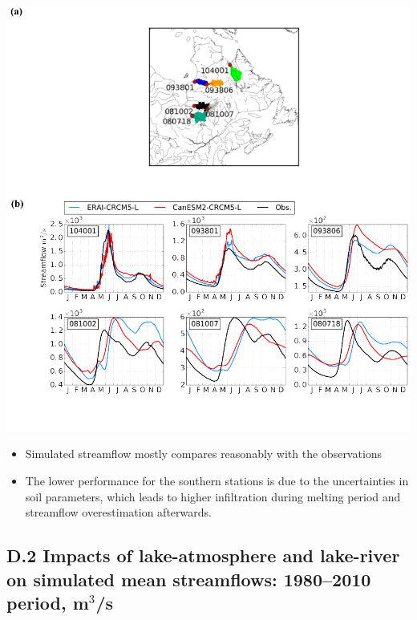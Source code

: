 \documentclass[a0,landscape]{a0poster}
\begin{document}
\begin{multicols}{3}
\begin{minipage}[c]{0.50\linewidth}
\begin{center}
  \includegraphics[width=0.95\linewidth]{streamflow_validation_6}
\end{center}
\end{minipage}
%
\begin{tcolorbox}[colback=white,colframe=green!40!black]
\begin{itemize}
  \item Simulated streamflow mostly compares reasonably with the observations
  \item The lower performance for the southern stations is due to the uncertainties in soil parameters, which leads to higher infiltration during melting period and streamflow overestimation afterwards.
\end{itemize}
\end{tcolorbox}

\subsection*{D.2 Impacts of lake-atmosphere and lake-river on simulated mean streamflows: 1980--2010 period, m$^3$/s}


\end{multicols}
\end{document}
